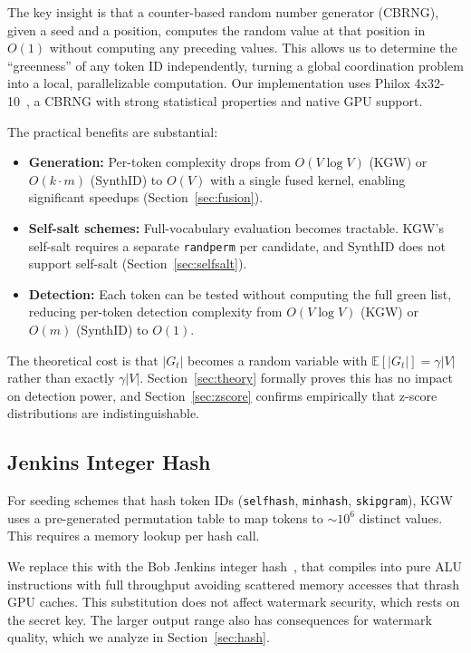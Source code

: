 \documentclass[11pt]{article}
\begin{document}
The key insight is that a counter-based random number generator (CBRNG), given a seed and a position, computes the random value at that position in $O(1)$ without computing any preceding values. This allows us to determine the ``greenness'' of any token ID independently, turning a global coordination problem into a local, parallelizable computation. Our implementation uses Philox 4x32-10~\cite{salmon2011parallel}, a CBRNG with strong statistical properties and native GPU support.

The practical benefits are substantial:
\begin{itemize}
\item \textbf{Generation:} Per-token complexity drops from $O(V \log V)$ (KGW) or $O(k \cdot m)$ (SynthID) to $O(V)$ with a single fused kernel, enabling significant speedups (Section~\ref{sec:fusion}).
\item \textbf{Self-salt schemes:} Full-vocabulary evaluation becomes tractable. KGW's self-salt requires a separate \texttt{randperm} per candidate, and SynthID does not support self-salt (Section~\ref{sec:selfsalt}).
\item \textbf{Detection:} Each token can be tested without computing the full green list, reducing per-token detection complexity from $O(V \log V)$ (KGW) or $O(m)$ (SynthID) to $O(1)$.
\end{itemize}

The theoretical cost is that $|G_t|$ becomes a random variable with $\mathbb{E}[|G_t|] = \gamma |V|$ rather than exactly $\gamma |V|$. Section~\ref{sec:theory} formally proves this has no impact on detection power, and Section~\ref{sec:zscore} confirms empirically that z-score distributions are indistinguishable.

\subsection{Jenkins Integer Hash}

For seeding schemes that hash token IDs (\texttt{selfhash}, \texttt{minhash}, \texttt{skipgram}), KGW uses a pre-generated permutation table to map tokens to ${\sim}10^6$ distinct values. This requires a memory lookup per hash call.

We replace this with the Bob Jenkins integer hash~\cite{jenkins1997hash}, that compiles into pure ALU instructions with full throughput avoiding scattered memory accesses that thrash GPU caches. This substitution does not affect watermark security, which rests on the secret key. The larger output range also has consequences for watermark quality, which we analyze in Section~\ref{sec:hash}.
\end{document}
